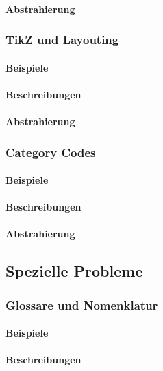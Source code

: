 \paragraph*{Abstrahierung}


\subsubsection{TikZ und Layouting}\label{problems:layouting}
\paragraph*{Beispiele}
\paragraph*{Beschreibungen}
\paragraph*{Abstrahierung}

\subsubsection{Category Codes}\label{problems:catcode}
\paragraph*{Beispiele}
\paragraph*{Beschreibungen}
\paragraph*{Abstrahierung}


\subsection{Spezielle Probleme}\label{problems:special}
\subsubsection{Glossare und Nomenklatur}\label{problems:glossaries}
\paragraph*{Beispiele}
\paragraph*{Beschreibungen}
